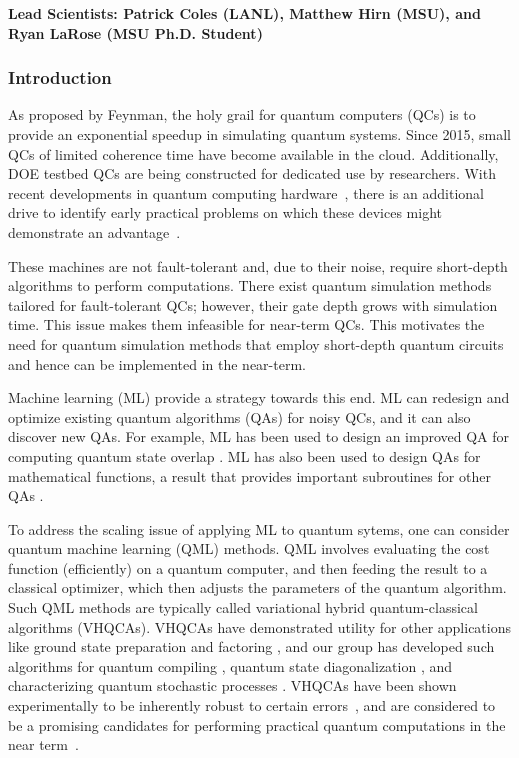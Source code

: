 \documentclass[10pt]{article}
\begin{document}
{\bf Lead Scientists: Patrick Coles (LANL), Matthew Hirn (MSU), and Ryan LaRose (MSU Ph.D. Student)}

\subsubsection{ Introduction} As proposed by Feynman, the holy grail for quantum computers (QCs) is to provide an exponential speedup in simulating quantum systems. Since 2015, small QCs of limited coherence time have become available in the cloud. Additionally, DOE testbed QCs are being constructed for dedicated use by researchers. With recent developments in quantum computing
hardware~\cite{Corcoles2015,Riste2015,Kelly2015,Barends2016,Roushan2017}, there is an additional drive to identify early practical problems on which these devices might demonstrate an advantage~\cite{Mohseni2017,Boixo2016}.


These machines are not fault-tolerant and, due to their noise, require short-depth algorithms to perform computations. There exist quantum simulation methods \cite{6-8} tailored for fault-tolerant QCs; however, their gate depth grows with simulation time. This issue makes them infeasible for near-term QCs. This motivates the need for quantum simulation methods that employ short-depth quantum circuits and hence can be implemented in the near-term. 

Machine learning (ML) provide a strategy towards this end. ML can redesign and optimize existing quantum algorithms (QAs) for noisy QCs, and it can also discover new QAs. For example, ML has been used to design an improved QA for computing quantum state overlap \cite{Cincio2018}. ML has also been used to design QAs for mathematical functions, a result that provides important subroutines for other QAs \cite{Mitarai2018}. 

To address the scaling issue of applying ML to quantum sytems, one can consider quantum machine learning (QML) methods. QML involves evaluating the cost function (efficiently) on a quantum computer, and then feeding the result to a classical optimizer, which then adjusts the parameters of the quantum algorithm. Such QML methods are typically called variational hybrid quantum-classical algorithms (VHQCAs). VHQCAs have demonstrated utility for other applications like ground state preparation \cite{Peruzzo2013,McClean2015} and factoring \cite{?}, and our group has developed such algorithms for quantum compiling \cite{Khatri2018}, quantum state diagonalization \cite{LaRose2018}, and characterizing quantum stochastic processes \cite{?}. VHQCAs have been shown experimentally to be inherently robust to certain errors~\cite{OMalley2016}, and are considered to be a promising candidates for performing practical
quantum computations in the near term~\cite{Wecker2015a,Mueck2015}. 
\end{document}
